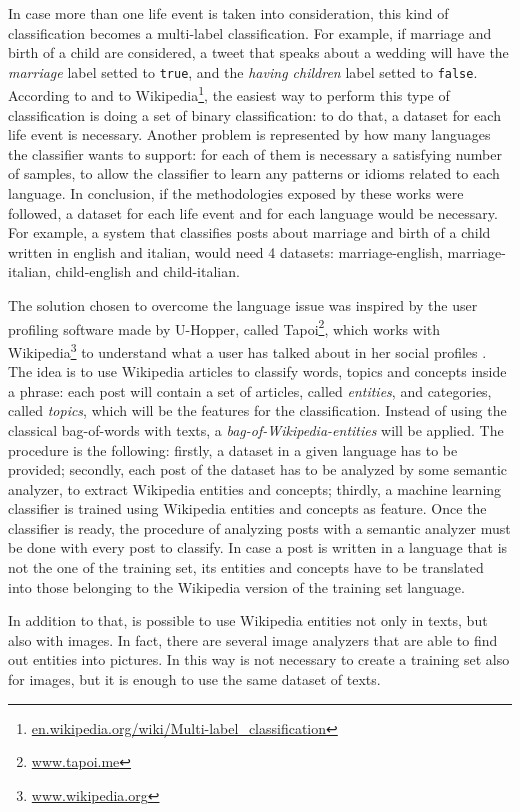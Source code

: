 In case more than one life event is taken into consideration, this kind of classification becomes a multi-label classification. For example, if marriage and birth of a child are considered, a tweet that speaks about a wedding will have the \textit{marriage} label setted to \texttt{true}, and the \textit{having children} label setted to \texttt{false}. According to \cite{cavalinclassification} and to Wikipedia\footnote{\url{en.wikipedia.org/wiki/Multi-label_classification}}, the easiest way to perform this type of classification is doing a set of binary classification: to do that, a dataset for each life event is necessary. Another problem is represented by how many languages the classifier wants to support: for each of them is necessary a satisfying number of samples, to allow the classifier to learn any patterns or idioms related to each language. In conclusion, if the methodologies exposed by these works were followed, a dataset for each life event and for each language would be necessary. For example, a system that classifies posts about marriage and birth of a child written in english and italian, would need 4 datasets: marriage-english, marriage-italian, child-english and child-italian.

The solution chosen to overcome the language issue was inspired by the user profiling software made by U-Hopper, called Tapoi\footnote{\url{www.tapoi.me}}, which works with Wikipedia\footnote{\url{www.wikipedia.org}} to understand what a user has talked about in her social profiles \cite{torrero2018wikipedia}. The idea is to use Wikipedia articles to classify words, topics and concepts inside a phrase: each post will contain a set of articles, called \textit{entities}, and categories, called \textit{topics}, which will be the features for the classification. Instead of using the classical bag-of-words with texts, a \textit{bag-of-Wikipedia-entities} will be applied. The procedure is the following: firstly, a dataset in a given language has to be provided; secondly, each post of the dataset has to be analyzed by some semantic analyzer, to extract Wikipedia entities and concepts; thirdly, a machine learning classifier is trained using Wikipedia entities and concepts as feature. Once the classifier is ready, the procedure of analyzing posts with a semantic analyzer must be done with every post to classify. In case a post is written in a language that is not the one of the training set, its entities and concepts have to be translated into those belonging to the Wikipedia version of the training set language.

In addition to that, is possible to use Wikipedia entities not only in texts, but also with images. In fact, there are several image analyzers that are able to find out entities into pictures. In this way is not necessary to create a training set also for images, but it is enough to use the same dataset of texts.

